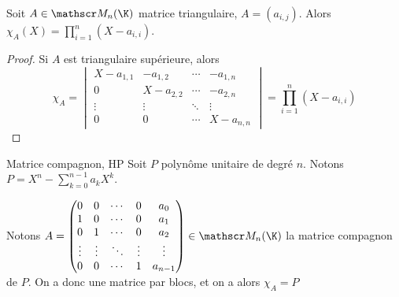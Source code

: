 \begin{proposition}{}{}
    Soit $A \in \mathscr M_n (\K)$ matrice triangulaire, $A = (a_{i, j})$. Alors 
    $\displaystyle \chi_A(X) = \prod_{i = 1 }^{ n } (X - a_{i, i})$.
\end{proposition}

\begin{proof}
    Si $A$ est triangulaire supérieure, alors 
    $$\chi_A = \begin{vmatrix}
        X - a_{1, 1} & -a_{1, 2} & \cdots & -a_{1, n} \\
        0 & X - a_{2, 2} & \cdots & -a_{2, n} \\
        \vdots & \vdots & \ddots & \vdots \\
        0 & 0 & \cdots & X - a_{n, n}
    \end{vmatrix} = \prod_{i = 1 }^{ n } (X - a_{i, i})$$
\end{proof}

\begin{definition}{Matrice compagnon, HP}{}
    Soit $P$ polynôme unitaire de degré $n$. Notons 
    $\displaystyle P = X^n - \sum_{k = 0 }^{n - 1} a_k X^k$.

    Notons $A = \begin{pmatrix}
        0 & 0 & \cdots & 0 & a_0 \\
        1 & 0 & \cdots & 0 & a_1 \\
        0 & 1 & \cdots & 0 & a_2 \\
        \vdots & \vdots & \ddots & \vdots & \vdots \\
        0 & 0 & \cdots & 1 & a_{n - 1}
    \end{pmatrix} \in \mathscr M_n(\K)$ la matrice compagnon de $P$. On a donc une matrice par blocs, 
    et on a alors $\chi_A = P$

\end{definition}


